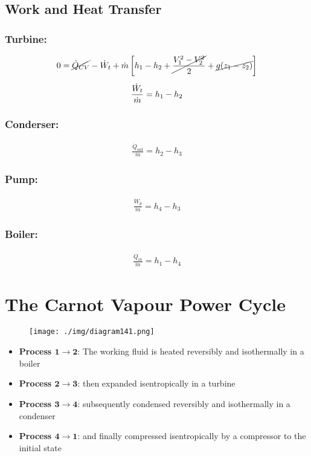 \subsection{Work and Heat Transfer}
\subsubsection{Turbine:}
\begin{gather}
  0 = \cancel{\dot{Q}_{CV}} - \dot{W}_t + \dot{m}\left[h_1 - h_2 + \cancel{\frac{V_1^2-V_2^2}{2}} + \cancel{g(z_1-z_2)}\right] \\[5pt]
  \frac{\dot{W}_t}{\dot{m}} = h_1 - h_2
\end{gather}
\subsubsection{Conderser:}
\begin{gather}
  \frac{\dot{Q}_{out}}{\dot{m}} = h_2-h_3
\end{gather}
\subsubsection{Pump:}
\begin{gather}
  \frac{\dot{W}_p}{\dot{m}} = h_4-h_3
\end{gather}
\subsubsection{Boiler:}
\begin{gather}
  \frac{\dot{Q}_{in}}{\dot{m}} = h_1-h_4
\end{gather}
\section{The Carnot Vapour Power Cycle}
\begin{figure}[H]
  \centering
  \texttt{[image: ./img/diagram141.png]}
  \caption{}
\end{figure}
\begin{itemize}[noitemsep]
  \item \textbf{Process $\mathbf{1\rightarrow 2}$}: The working fluid is heated reversibly and isothermally in a boiler
  \item \textbf{Process $\mathbf{2\rightarrow 3}$}: then expanded isentropically in a turbine
  \item \textbf{Process $\mathbf{3\rightarrow 4}$}: subsequently condensed reversibly and isothermally in a condenser
  \item \textbf{Process $\mathbf{4\rightarrow 1}$}: and finally compressed isentropically by a compressor to the initial state
\end{itemize}
